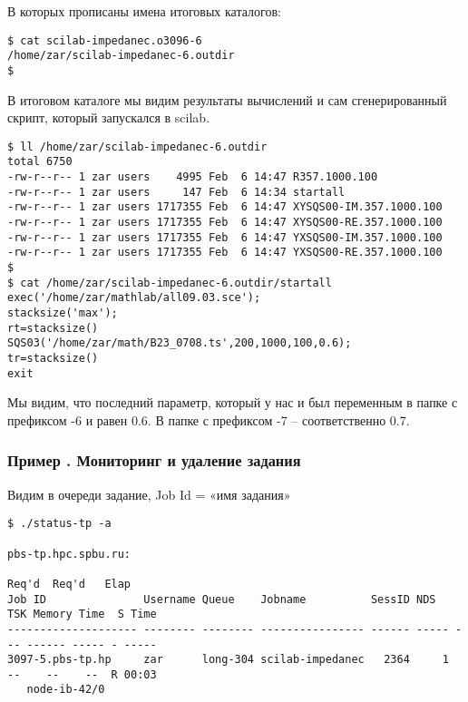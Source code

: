\documentclass[a4paper,8pt]{extreport}
\newcounter{ex}
\begin{document}
В которых прописаны имена итоговых каталогов:
\begin{lstlisting}
$ cat scilab-impedanec.o3096-6
/home/zar/scilab-impedanec-6.outdir
$
\end{lstlisting}

В итоговом каталоге мы видим результаты вычислений и сам сгенерированный скрипт, который запускался в scilab.
\begin{lstlisting}
$ ll /home/zar/scilab-impedanec-6.outdir
total 6750
-rw-r--r-- 1 zar users    4995 Feb  6 14:47 R357.1000.100
-rw-r--r-- 1 zar users     147 Feb  6 14:34 startall
-rw-r--r-- 1 zar users 1717355 Feb  6 14:47 XYSQS00-IM.357.1000.100
-rw-r--r-- 1 zar users 1717355 Feb  6 14:47 XYSQS00-RE.357.1000.100
-rw-r--r-- 1 zar users 1717355 Feb  6 14:47 YXSQS00-IM.357.1000.100
-rw-r--r-- 1 zar users 1717355 Feb  6 14:47 YXSQS00-RE.357.1000.100
$
$ cat /home/zar/scilab-impedanec-6.outdir/startall 
exec('/home/zar/mathlab/all09.03.sce');
stacksize('max');
rt=stacksize()
SQS03('/home/zar/math/B23_0708.ts',200,1000,100,0.6);
tr=stacksize()
exit
\end{lstlisting}

Мы видим, что последний параметр, который у нас и был переменным в папке с префиксом -6 и равен 0.6. В папке с префиксом -7 – соответственно 0.7.


\subsubsection{Пример . Мониторинг и удаление задания}

Видим в очереди задание, Job Id = «имя задания»
\begin{lstlisting}
$ ./status-tp -a

pbs-tp.hpc.spbu.ru: 
                                                                         Req'd  Req'd   Elap
Job ID               Username Queue    Jobname          SessID NDS   TSK Memory Time  S Time
-------------------- -------- -------- ---------------- ------ ----- --- ------ ----- - -----
3097-5.pbs-tp.hp     zar      long-304 scilab-impedanec   2364     1  --    --    --  R 00:03
   node-ib-42/0
\end{lstlisting}
\end{document}
